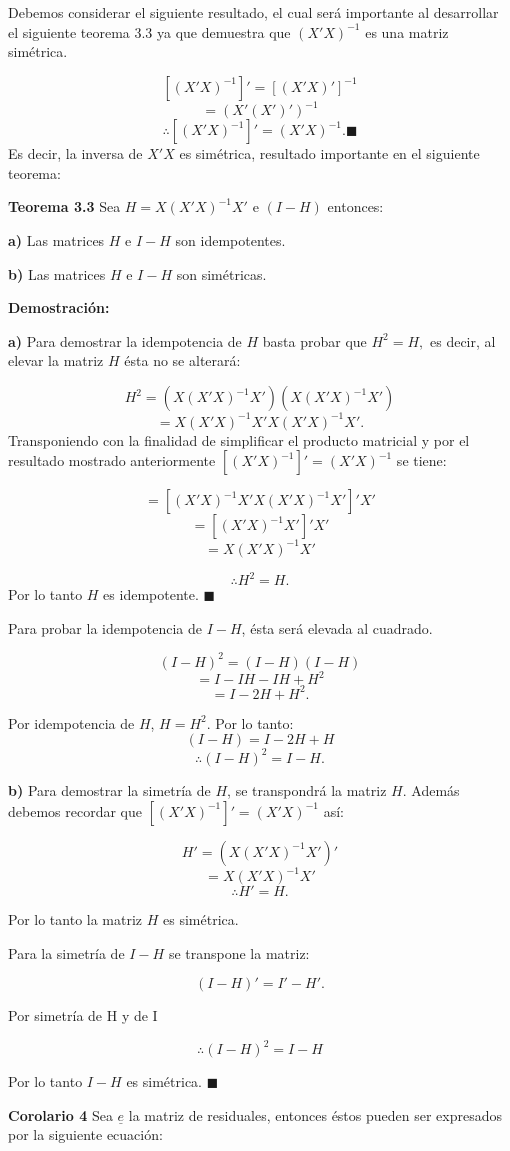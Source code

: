 \documentclass[a4paper,oneside,openany]{book}
\begin{document}
Debemos considerar el siguiente resultado, el cual será importante al
desarrollar el siguiente teorema 3.3 ya que demuestra que \((X'X)^{-1}\)
es una matriz simétrica.

\[[(X'X)^{-1}]'=[(X'X)']^{-1}\] \[=(X'(X')')^{-1}\]
\[\therefore [(X'X)^{-1}]'= (X'X)^{-1}. \blacksquare\] Es decir, la
inversa de \(X'X\) es simétrica, resultado importante en el siguiente
teorema:

\textbf{Teorema 3.3} Sea \(H=X(X'X)^{-1}X'\) e \((I-H)\) entonces:

\textbf{a)} Las matrices \(H\) e \(I-H\) son idempotentes.

\textbf{b)} Las matrices \(H\) e \(I-H\) son simétricas.

\textbf{Demostración:}

\textbf{a)} Para demostrar la idempotencia de \(H\) basta probar que
\(H^2=H,\) es decir, al elevar la matriz \(H\) ésta no se alterará:

\[H^2=(X(X'X)^{-1}X')(X(X'X)^{-1}X')\] \[=X(X'X)^{-1}X'X(X'X)^{-1}X'.\]
Transponiendo con la finalidad de simplificar el producto matricial y
por el resultado mostrado anteriormente \([(X'X)^{-1}]'=(X'X)^{-1}\) se
tiene:

\[=[(X'X)^{-1}X'X(X'X)^{-1}X']'X'\] \[=[(X'X)^{-1}X']'X'\]
\[=X(X'X)^{-1}X'\]

\[\therefore H^2=H.\] Por lo tanto \(H\) es idempotente.
\(\blacksquare\)

Para probar la idempotencia de \(I-H\), ésta será elevada al cuadrado.

\[(I-H)^2=(I-H)(I-H)\] \[=I-IH-IH+H^2\] \[=I-2H+H^2.\]

Por idempotencia de \(H\), \(H=H^2\). Por lo tanto: \[(I-H)=I-2H+H\]
\[\therefore (I-H)^2=I-H.\]

\textbf{b)} Para demostrar la simetría de \(H\), se transpondrá la
matriz \(H\). Además debemos recordar que \([(X'X)^{-1}]'=(X'X)^{-1}\)
así:

\[H'= (X(X'X)^{-1}X')'\] \[=X(X'X)^{-1}X'\] \[\therefore H'= H.\]

Por lo tanto la matriz \(H\) es simétrica.

Para la simetría de \(I-H\) se transpone la matriz:

\[(I-H)'=I'-H'.\]

Por simetría de H y de I

\[\therefore (I-H)^2=I-H\]

Por lo tanto \(I-H\) es simétrica. \(\blacksquare\)

\textbf{Corolario 4} Sea \(\underline{e}\) la matriz de residuales,
entonces éstos pueden ser expresados por la siguiente ecuación:
\end{document}
